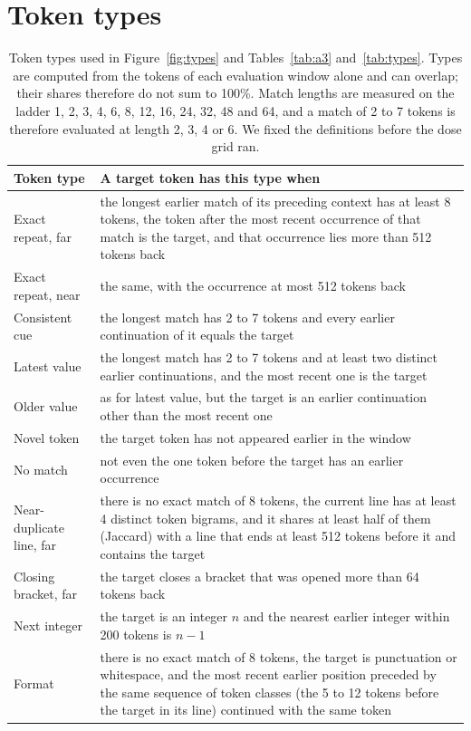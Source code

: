 \section{Token types}
\label{app:tags}

\begin{table}[!htb]
\centering
\footnotesize
\begin{tabular}{@{}lp{}@{}}
\toprule
Token type & A target token has this type when \\
\midrule
Exact repeat, far & the longest earlier match of its preceding context has at least 8 tokens, the
token after the most recent occurrence of that match is the target, and that occurrence lies more
than 512 tokens back \\
Exact repeat, near & the same, with the occurrence at most 512 tokens back \\
Consistent cue & the longest match has 2 to 7 tokens and every earlier continuation of it equals
the target \\
Latest value & the longest match has 2 to 7 tokens and at least two distinct earlier
continuations, and the most recent one is the target \\
Older value & as for latest value, but the target is an earlier continuation other than the most
recent one \\
Novel token & the target token has not appeared earlier in the window \\
No match & not even the one token before the target has an earlier occurrence \\
Near-duplicate line, far & there is no exact match of 8 tokens, the current line has at least 4
distinct token bigrams, and it shares at least half of them (Jaccard) with a line that ends at
least 512 tokens before it and contains the target \\
Closing bracket, far & the target closes a bracket that was opened more than 64 tokens back \\
Next integer & the target is an integer $n$ and the nearest earlier integer within 200 tokens is
$n - 1$ \\
Format & there is no exact match of 8 tokens, the target is punctuation or whitespace, and the
most recent earlier position preceded by the same sequence of token classes (the 5 to 12 tokens
before the target in its line) continued with the same token \\
\bottomrule
\end{tabular}
\caption{Token types used in Figure~\ref{fig:types} and Tables~\ref{tab:a3} and~\ref{tab:types}. Types are computed from the
tokens of each evaluation window alone and can overlap; their shares therefore do not sum to 100\%.
Match lengths are measured on the ladder 1, 2, 3, 4, 6, 8, 12, 16, 24, 32, 48 and 64, and a match
of 2 to 7 tokens is therefore evaluated at length 2, 3, 4 or 6. We
fixed the definitions before the dose grid ran.}
\label{tab:tags}
\end{table}

